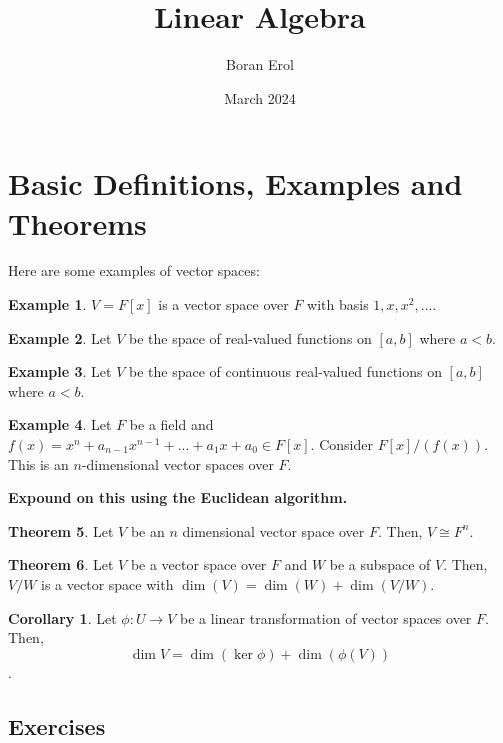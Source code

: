 \documentclass{article}
\title{Linear Algebra}
\date{March 2024}
\author{Boran Erol}
\theoremstyle{definition}
\newtheorem{theorem}{Theorem}[section]
\newtheorem{corollary}{Corollary}[theorem]
\newtheorem{example}[theorem]{Example}
\begin{document}
\maketitle

\section{Basic Definitions, Examples and Theorems}

Here are some examples of vector spaces:

\begin{example}
    $V = F[x]$ is a vector space over $F$ with basis $1,x,x^{2},...$.
\end{example}

\begin{example}
    Let $V$ be the space of real-valued functions on $[a,b]$ where $a < b$.
\end{example}

\begin{example}
    Let $V$ be the space of continuous real-valued functions on $[a,b]$ where $a < b$.
\end{example}

\begin{example}
    Let $F$ be a field and $f(x) = x^{n} + a_{n-1}x^{n-1} + ... + a_{1}x + a_{0} \in F[x]$.
    Consider $F[x]/(f(x))$. This is an $n$-dimensional vector spaces over $F$.

    \textbf{Expound on this using the Euclidean algorithm.}
\end{example}

\begin{theorem}
    Let $V$ be an $n$ dimensional vector space over $F$. Then, $V \cong F^{n}$.
\end{theorem}

\begin{theorem}
    Let $V$ be a vector space over $F$ and $W$ be a subspace of $V$. Then, $V/W$ is a vector space
    with $\dim(V) = \dim(W) + \dim(V/W)$.
\end{theorem}

\begin{corollary}
    Let $\phi: U \xrightarrow{} V$ be a linear transformation of vector spaces over $F$. Then, 
    \[\dim V = \dim(\ker \phi) + \dim(\phi(V))\].
\end{corollary}

\subsection{Exercises}
\end{document}
